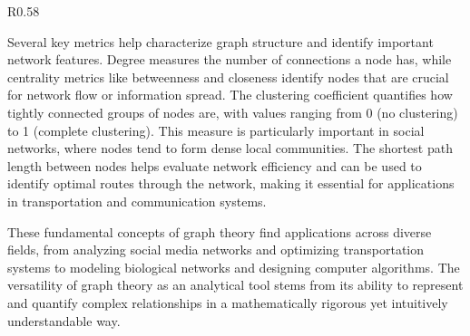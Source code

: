 \begin{wrapfigure}{R}{0.58\textwidth}
\begin{tcolorbox}[every float=\centering, drop shadow, title=Concepts of Graph Theory ,colback=white,colframe=WMgreen,
  colbacktitle=WMgreen,]
  \label{fig:BasicGraphs}
 \end{tcolorbox}
 \end{wrapfigure}
 \FloatBarrier %
 
Several key metrics help characterize graph structure and identify important network features. \gls{Degree} measures the number of connections a node has, while \gls{centrality} metrics like betweenness and closeness identify nodes that are crucial for network flow or information spread. The \gls{clustering coefficient} quantifies how tightly connected groups of nodes are, with values ranging from 0 (no clustering) to 1 (complete clustering). This measure is particularly important in social networks, where nodes tend to form dense local communities. The shortest path length between nodes helps evaluate network efficiency and can be used to identify optimal routes through the network, making it essential for applications in transportation and communication systems.

These fundamental concepts of graph theory find applications across diverse fields, from analyzing social media networks and optimizing transportation systems to modeling biological networks and designing computer algorithms. The versatility of graph theory as an analytical tool stems from its ability to represent and quantify complex relationships in a mathematically rigorous yet intuitively understandable way.

